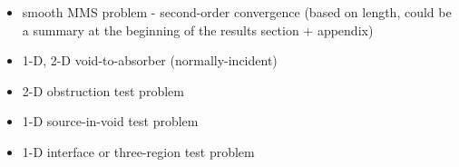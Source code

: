 \begin{itemize}
  \item smooth MMS problem - second-order convergence (based on length, could be a summary at the beginning of the results section + appendix)
  \item 1-D, 2-D void-to-absorber (normally-incident)
  \item 2-D obstruction test problem
  \item 1-D source-in-void test problem
  \item 1-D interface or three-region test problem
\end{itemize}
